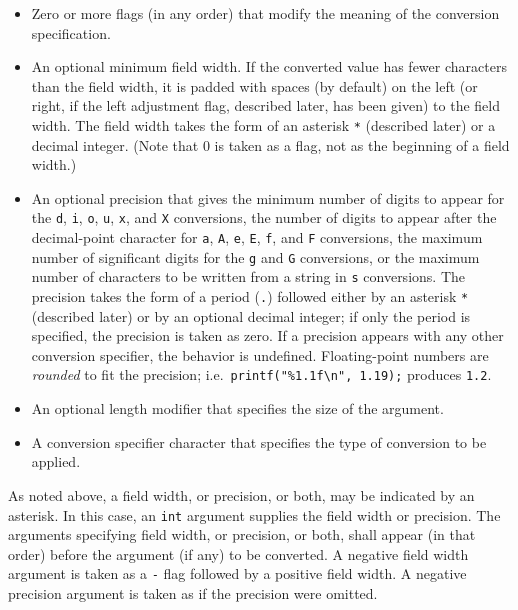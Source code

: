 \begin{itemize}
	\item Zero or more flags (in any order) that modify the meaning of the
conversion specification.
	\item An optional minimum field width. If the converted value has fewer
characters than the field width, it is padded with spaces (by default) on the
left (or right, if the left adjustment flag, described later, has been given)
to the field width. The field width takes the form of an asterisk \texttt{*}
(described later) or a decimal integer. (Note that 0 is taken as a flag, not as
the beginning of a field width.)
	\item An optional precision that gives the minimum number of digits to
appear for the \texttt{d}, \texttt{i}, \texttt{o}, \texttt{u}, \texttt{x}, and
\texttt{X} conversions, the number of digits to appear after the decimal-point
character for \texttt{a}, \texttt{A}, \texttt{e}, \texttt{E}, \texttt{f}, and
\texttt{F} conversions, the maximum number of significant digits for the
\texttt{g} and \texttt{G} conversions, or the maximum number of characters to
be written from a string in \texttt{s} conversions. The precision takes the
form of a period (\texttt{.}) followed either by an asterisk \texttt{*}
(described later) or by an optional decimal integer; if only the period is
specified, the precision is taken as zero. If a precision appears with any
other conversion specifier, the behavior is undefined. Floating-point numbers
are \emph{rounded} to fit the precision; i.e.\
\texttt{printf("\%1.1f\textbackslash{}n", 1.19);} produces \texttt{1.2}.
	\item An optional length modifier that specifies the size of the argument.
	\item A conversion specifier character that specifies the type of
conversion to be applied.
\end{itemize}

As noted above, a field width, or precision, or both, may be indicated by an
asterisk. In this case, an \texttt{int} argument supplies the field width or
precision. The arguments specifying field width, or precision, or both, shall
appear (in that order) before the argument (if any) to be converted. A negative
field width argument is taken as a \texttt{-} flag followed by a positive field
width. A negative precision argument is taken as if the precision were omitted.

